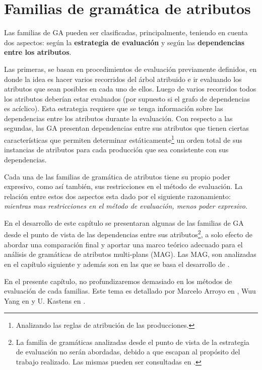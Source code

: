 \chapter{Familias de gramática de atributos}
\label{chap:clas_ag}
\minitoc

Las familias de GA pueden ser clasificadas, principalmente, teniendo en cuenta dos aspectos: según la \textbf{estrategia de evaluación} y según las \textbf{dependencias entre los atributos}. 

Las primeras, se basan en procedimientos de evaluación previamente definidos, en donde la idea es hacer varios recorridos del árbol atribuido e ir evaluando los atributos que sean posibles en cada uno de ellos. Luego de varios recorridos todos los atributos deberían estar evaluados (por supuesto si el grafo de dependencias es acíclico). Esta estrategia requiere que se tenga información sobre las dependencias entre los atributos durante la evaluación. Con respecto a las segundas, las GA presentan dependencias entre sus atributos que tienen ciertas características que permiten determinar estáticamente\footnote{Analizando las reglas de atribución de las producciones.} un orden total de sus instancias de atributos para cada producción que sea consistente con sus dependencias. 

Cada una de las familias de gramática de atributos tiene su propio poder expresivo, como así también, sus restricciones en el método de evaluación. La relación entre estos dos aspectos esta dado por el siguiente razonamiento: \textit{mientras mas restricciones en el método de evaluación, menos poder expresivo}.

En el desarrollo de este capítulo se presentaran algunas de las familias de GA desde el punto de vista de las dependencias entre sus atributos\footnote{La familia de gramáticas analizadas desde el punto de vista de la estrategia de evaluación no serán abordadas, debido a que escapan al propósito del trabajo realizado. Las mismas pueden ser consultadas en \cite{tesismarcelo}.}, a solo efecto de abordar una comparación final y aportar una marco teórico adecuado para el análisis de gramáticas de atributos multi-plans (MAG). Las MAG, son analizadas en el capítulo siguiente y además son en las que se basa el desarrollo de \maggen. 

En el presente capítulo, no profundizaremos demasiado en los métodos de evaluación de cada familias. Este tema es detallado por Marcelo Arroyo en \cite{tesismarcelo}, Wuu Yang en \cite{wuu-yang2} y U. Kastens en \cite{kastens}.

